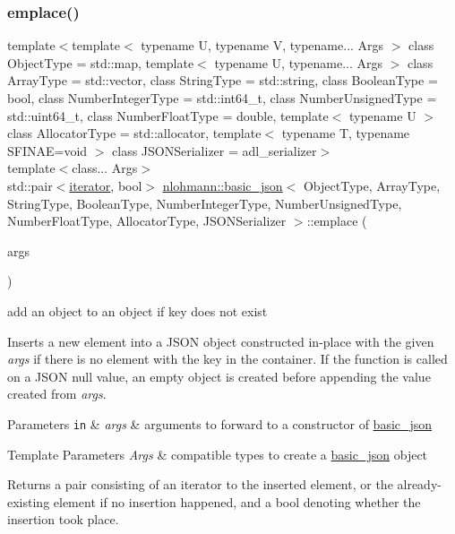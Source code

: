 \subsubsection{\texorpdfstring{emplace()}{emplace()}}
{\footnotesize\ttfamily template$<$template$<$ typename U, typename V, typename... Args $>$ class Object\+Type = std\+::map, template$<$ typename U, typename... Args $>$ class Array\+Type = std\+::vector, class String\+Type  = std\+::string, class Boolean\+Type  = bool, class Number\+Integer\+Type  = std\+::int64\+\_\+t, class Number\+Unsigned\+Type  = std\+::uint64\+\_\+t, class Number\+Float\+Type  = double, template$<$ typename U $>$ class Allocator\+Type = std\+::allocator, template$<$ typename T, typename S\+F\+I\+N\+A\+E=void $>$ class J\+S\+O\+N\+Serializer = adl\+\_\+serializer$>$ \\
template$<$class... Args$>$ \\
std\+::pair$<$\mbox{\hyperlink{classnlohmann_1_1basic__json_a099316232c76c034030a38faa6e34dca}{iterator}}, bool$>$ \mbox{\hyperlink{classnlohmann_1_1basic__json}{nlohmann\+::basic\+\_\+json}}$<$ Object\+Type, Array\+Type, String\+Type, Boolean\+Type, Number\+Integer\+Type, Number\+Unsigned\+Type, Number\+Float\+Type, Allocator\+Type, J\+S\+O\+N\+Serializer $>$\+::emplace (\begin{DoxyParamCaption}\item[{Args \&\&...}]{args }\end{DoxyParamCaption})\hspace{0.3cm}{\ttfamily [inline]}}



add an object to an object if key does not exist 

Inserts a new element into a J\+S\+ON object constructed in-\/place with the given {\itshape args} if there is no element with the key in the container. If the function is called on a J\+S\+ON null value, an empty object is created before appending the value created from {\itshape args}.


\begin{DoxyParams}[1]{Parameters}
\mbox{\tt in}  & {\em args} & arguments to forward to a constructor of \mbox{\hyperlink{classnlohmann_1_1basic__json}{basic\+\_\+json}} \\
\hline
\end{DoxyParams}

\begin{DoxyTemplParams}{Template Parameters}
{\em Args} & compatible types to create a \mbox{\hyperlink{classnlohmann_1_1basic__json}{basic\+\_\+json}} object\\
\hline
\end{DoxyTemplParams}
\begin{DoxyReturn}{Returns}
a pair consisting of an iterator to the inserted element, or the already-\/existing element if no insertion happened, and a bool denoting whether the insertion took place.
\end{DoxyReturn}

